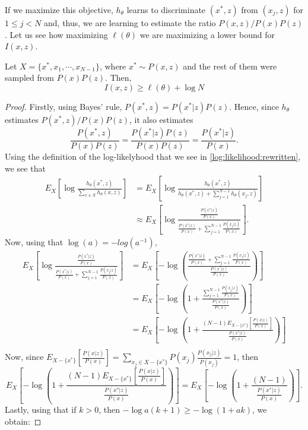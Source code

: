 If we maximize this objective, $h_\theta$ learns to discriminate $(x^*,z)$ from $(x_j,z)$ for $ 1 \leq j < N$ and, thus, we are learning to estimate the ratio $P(x,z)/P(x)P(z)$. Let us see how maximizing $\ell(\theta)$ we are maximizing a lower bound for $I(x,z)$.

\begin{nprop}
Let $X = \{x^*, x_1,\cdots,x_{N-1} \}$, where $x^* \sim P(x,z)$ and the rest of them were sampled from $P(x)P(z)$. Then,
\[
I(x,z) \geq \ell(\theta) + \log N
\]
\end{nprop}
\begin{proof}

Firstly, using Bayes' rule, $P(x^*,z) = P(x^*|z)P(z)$. Hence, since $h_\theta$ estimates $P(x^*,z)/P(x)P(z)$, it also estimates
\[
\frac{P(x^*,z)}{P(x)P(z)} = \frac{P(x^*|z)P(z)}{P(x)P(z)} = \frac{P(x^*|z)}{P(x)}.
\]
Using the definition of the log-likelyhood that we see in \ref{log:likelihood:rewritten}, we see that
\begin{align*}
E_X \left[ \log \frac{h_\theta(x^*,z)}{\sum_{x \in X}h_\theta(x,z)}\right] & =  E_X \left[ \log \frac{h_\theta(x^*,z)}{ h_\theta(x^*,z) + \sum_{j = 1}^{N-1} h_\theta(x_j,z)}\right] \\
& \approx E_X \left[ \log \frac{\frac{P(x^*|z)}{P(x)}}{ \frac{P(x^*|z)}{P(x)} + \sum_{j = 1}^{N-1} \frac{P(x_j|z)}{P(x)}}\right].
\end{align*}
Now, using that $\log(a) = -log(a^{-1})$,
\begin{align*}
E_X \left[ \log \frac{\frac{P(x^*|z)}{P(x)}}{ \frac{P(x^*|z)}{P(x)} + \sum_{j = 1}^{N-1} \frac{P(x_j|z)}{P(x)}}\right] & = E_X\left[ -\log\left( \frac{\frac{P(x^*|z)}{P(x)} + \sum_{j = 1}^{N-1} \frac{P(x_j|z)}{P(x)}}{\frac{P(x^*|z)}{P(x)}}\right) \right] \\
& = E_X\left[ -\log\left( 1+ \frac{ \sum_{j = 1}^{N-1} \frac{P(x_j|z)}{P(x)}}{\frac{P(x^*|z)}{P(x)}} \right) \right] \\
& = E_X\left[ -\log\left( 1+ \frac{ (N-1) E_{X - \{x^*\}}\left[\frac{P(x|z)}{P(x)}\right] }{\frac{P(x^*|z)}{P(x)}}\right)\right] \\
\end{align*}
Now, since $E_{X - \{x^*\}} \left[ \frac{P(x|z)}{P(x)} \right] = \sum_{x_j \in X - \{x^*\}} P(x_j) \frac{P(x_j|z)}{P(x_j)} = 1$, then
\[
E_X\left[ -\log\left( 1+ \frac{ (N-1) E_{X - \{x^*\}}\left[\frac{P(x|z)}{P(x)}\right] }{\frac{P(x^*|z)}{P(x)}}\right)\right]  
= E_X\left[ -\log\left( 1+ \frac{ (N-1)}{\frac{P(x^*|z)}{P(x)}} \right)\right].
\] 
Lastly, using that if $k > 0$, then $- \log a(k+1) \geq -\log(1+ak)$, we obtain:

\end{proof}
